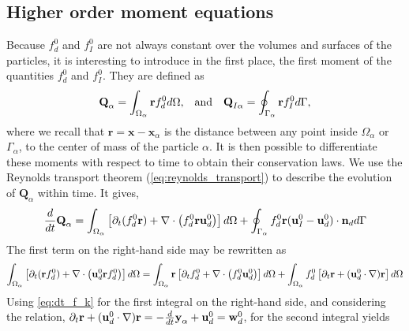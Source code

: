 



\subsection{Higher order moment equations}

Because $f_d^0$ and $f_I^0$ are not always constant over the volumes and surfaces of the particles, it is interesting to introduce in the first place, the first moment of the quantities $f_d^0$ and $f_I^0$. 
They are defined as
\begin{align}
    &\textbf{Q}_\alpha 
    = \int_{\Omega_\alpha}  \textbf{r} f_d^0  d\Omega,
    &\text{and}&
    &\textbf{Q}_{I\alpha}
    = \oint_{\Gamma_\alpha}  \textbf{r} f_I^0  d\Gamma,
    \label{eq:first_moment_definition}
\end{align}
where we recall that $\textbf{r} = \textbf{x} - \textbf{x}_\alpha$ is the distance between any point inside $\Omega_\alpha$ or $\Gamma_\alpha$, to the center of mass of the particle $\alpha$.
It is then possible to differentiate these moments with respect to time to obtain their conservation laws.
We use the Reynolds transport theorem (\ref{eq:reynolds_transport}) to describe the evolution of $\textbf{Q}_\alpha$ within time. 
It gives, 
\begin{equation*}
    \frac{d}{dt} \textbf{Q}_\alpha
      =  \int_{\Omega_\alpha} \left[
        \partial_t(  f_d^0\textbf{r})
        + \mathbf{\nabla}\cdot \left(  f_d^0 \textbf{r}\textbf{u}_d^0\right)
    \right] d\Omega 
    + \oint_{\Gamma_\alpha}   f_d^0 \textbf{r}  (\textbf{u}_I^0-\textbf{u}_d^0)\cdot \textbf{n}_d d\Gamma
\end{equation*}
The first term on the right-hand side may be rewritten as
\begin{equation*}
\int_{\Omega_\alpha}  \left[
        \partial_t(\textbf{r}  f_d^0)+ \mathbf{\nabla}\cdot \left( \textbf{u}_d^0 \textbf{r} f^0_d\right) 
    \right] d\Omega
    = \int_{\Omega_\alpha} \textbf{r}\left[
        \partial_t f_d^0
        + \mathbf{\nabla}\cdot \left(f_d^0 \textbf{u}_d^0\right)
    \right]  d\Omega
    + \int_{\Omega_\alpha}  f_d^0 \left[
        \partial_t \textbf{r}
        +(\textbf{u}_d^0 \cdot \mathbf{\nabla}) \textbf{r}
    \right] d\Omega
\end{equation*}
Using \ref{eq:dt_f_k} for the first integral on the right-hand side, and considering the relation,
$  \partial_t \textbf{r}
+ (\textbf{u}_d^0 \cdot \mathbf{\nabla}) \textbf{r}
= - \frac{d}{dt} \textbf{y}_\alpha  + \textbf{u}_d^0 
= \textbf{w}_d^0$,
for the second integral yields 

